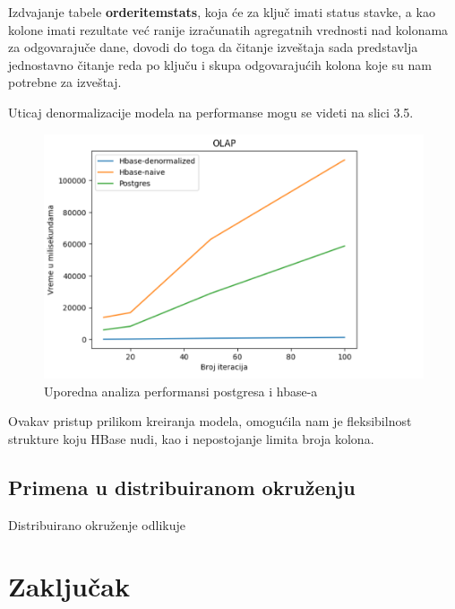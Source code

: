 \documentclass[12pt,oneside]{memoir}
\begin{document}
Izdvajanje tabele \textbf{orderitemstats}, koja će za ključ imati status stavke, a kao kolone imati rezultate već ranije izračunatih agregatnih vrednosti nad kolonama za odgovarajuče dane, dovodi do toga da čitanje izveštaja sada predstavlja jednostavno čitanje reda po ključu i skupa odgovarajućih kolona koje su nam potrebne za izveštaj.

Uticaj denormalizacije modela na performanse mogu se videti na slici 3.5.

\begin{figure}[!ht]
  \centering
  \includegraphics[width=1\textwidth]{olap-vizualization.png}
  \caption{Uporedna analiza performansi postgresa i hbase-a}
  \label{fig:grafikon}
\end{figure}

Ovakav pristup prilikom kreiranja modela, omogućila nam je fleksibilnost strukture koju HBase nudi, kao i nepostojanje limita broja kolona. 

\pagebreak


\section{Primena u distribuiranom okruženju}


Distribuirano okruženje odlikuje 

\chapter{Zaključak}

\literatura
\end{document}
